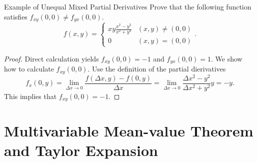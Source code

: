 \begin{example}{Example of Unequal Mixed Partial Derivatives}{}
  Prove that the following function satisfies $f_{xy}(0, 0) \neq f_{yx}(0, 0)$.
  \begin{equation}
    f(x, y) =
    \begin{cases}
      xy \frac{x^2 - y^2}{x^2 + y^2} & (x, y) \neq (0, 0)\\
      0 & (x, y) = (0, 0)
    \end{cases}.
  \end{equation}
\end{example}

\begin{proof}
  Direct calculation yields $f_{xy}(0, 0) = -1$ and $f_{yx}(0, 0) = 1$.
  We show how to calculate $f_{xy}(0, 0)$. Use the definition of the partial dierivatives
  \begin{equation}
    f_x(0, y) = \lim \limits _{\Delta x \rightarrow 0} \frac{f(\Delta x, y) - f(0, y)}{\Delta x}
    = \lim \limits _{\Delta x \rightarrow 0} \frac{\Delta x^2 - y^2}{\Delta x^2 + y^2}y = -y.
  \end{equation}
  This implies that $f_{xy}(0, 0) = -1$.
\end{proof}

\section{Multivariable Mean-value Theorem and Taylor Expansion}







